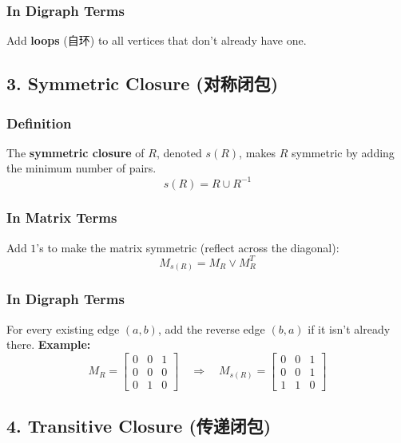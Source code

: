 \documentclass[10pt,a4paper,openany]{ctexbook}
\theoremstyle{definition}
\theoremstyle{remark}
\begin{document}
\subsubsection{In Digraph Terms}

Add \textbf{loops} (自环) to all vertices that don't already have one.
\vspace{-2pt}

\subsection{3. Symmetric Closure (对称闭包)}

\subsubsection{Definition}

The \textbf{symmetric closure} of $R$, denoted $s(R)$, makes $R$ symmetric by adding the minimum number of pairs.
\[
s(R) = R \cup R^{-1}
\]

\subsubsection{In Matrix Terms}

Add $1$'s to make the matrix symmetric (reflect across the diagonal):
\[
M_{s(R)} = M_R \lor M_R^T
\]

\subsubsection{In Digraph Terms}

For every existing edge $(a,b)$, add the reverse edge $(b,a)$ if it isn't already there.
\textbf{Example:}
\[
M_R = \begin{bmatrix}
0 & 0 & 1 \\
0 & 0 & 0 \\
0 & 1 & 0
\end{bmatrix}
\quad\Rightarrow\quad
M_{s(R)} = \begin{bmatrix}
0 & 0 & 1 \\
0 & 0 & 1 \\
1 & 1 & 0
\end{bmatrix}
\]

\vspace{-2pt}

\subsection{4. Transitive Closure (传递闭包)}
\end{document}
